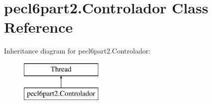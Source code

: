 \hypertarget{classpecl6part2_1_1_controlador}{}\section{pecl6part2.\+Controlador Class Reference}
\label{classpecl6part2_1_1_controlador}
Inheritance diagram for pecl6part2.\+Controlador\+:\begin{figure}[H]
\begin{center}
\leavevmode
\includegraphics[height=2.000000cm]{classpecl6part2_1_1_controlador}
\end{center}
\end{figure}
